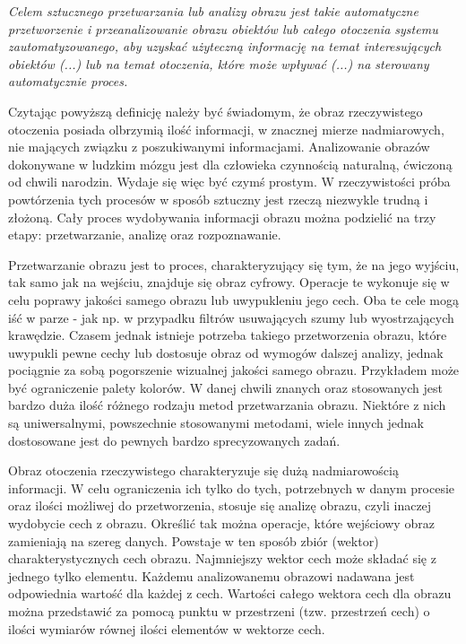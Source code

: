 \textit{Celem sztucznego przetwarzania lub analizy obrazu jest takie automatyczne przetworzenie i przeanalizowanie obrazu obiektów lub całego otoczenia systemu zautomatyzowanego, aby uzyskać użyteczną informację na temat interesujących obiektów (...) lub na temat otoczenia, które może wpływać (...) na sterowany automatycznie proces.}\cite{Tadeusiewicz}

Czytając powyższą definicję należy być świadomym, że obraz rzeczywistego otoczenia posiada olbrzymią ilość informacji, w znacznej mierze nadmiarowych, nie mających związku z poszukiwanymi informacjami. Analizowanie obrazów dokonywane w ludzkim mózgu jest dla człowieka czynnością naturalną, ćwiczoną od chwili narodzin. Wydaje się więc być czymś prostym. W rzeczywistości próba powtórzenia tych procesów w sposób sztuczny jest rzeczą niezwykle trudną i złożoną. Cały proces wydobywania informacji obrazu można podzielić na trzy etapy: przetwarzanie, analizę oraz rozpoznawanie.

Przetwarzanie obrazu jest to proces, charakteryzujący się tym, że na jego wyjściu, tak samo jak na wejściu, znajduje się obraz cyfrowy. Operacje te wykonuje się w celu poprawy jakości samego obrazu lub uwypukleniu jego cech. Oba te cele mogą iść w parze - jak np. w przypadku filtrów usuwających szumy lub wyostrzających krawędzie. Czasem jednak istnieje potrzeba takiego przetworzenia obrazu, które uwypukli pewne cechy lub dostosuje obraz od wymogów dalszej analizy, jednak pociągnie za sobą pogorszenie wizualnej jakości samego obrazu. Przykładem może być ograniczenie palety kolorów. W danej chwili znanych oraz stosowanych jest bardzo duża ilość różnego rodzaju metod przetwarzania obrazu. Niektóre z nich są uniwersalnymi, powszechnie stosowanymi metodami, wiele innych jednak dostosowane jest do pewnych bardzo sprecyzowanych zadań.

Obraz otoczenia rzeczywistego charakteryzuje się dużą nadmiarowością informacji. W celu ograniczenia ich tylko do tych, potrzebnych w danym procesie oraz ilości możliwej do przetworzenia, stosuje się analizę obrazu, czyli inaczej wydobycie cech z obrazu. Określić tak można operacje, które wejściowy obraz zamieniają na szereg danych. Powstaje w ten sposób zbiór (wektor) charakterystycznych cech obrazu. Najmniejszy wektor cech może składać się z jednego tylko elementu. Każdemu analizowanemu obrazowi nadawana jest odpowiednia wartość dla każdej z cech. Wartości całego wektora cech dla obrazu można przedstawić za pomocą punktu w przestrzeni (tzw. przestrzeń cech) o ilości wymiarów równej ilości elementów w wektorze cech.

